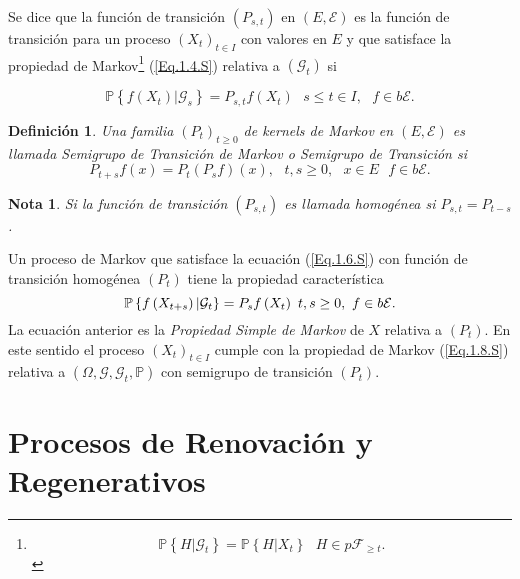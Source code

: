\documentclass{article}
\newtheorem{Def}{Definición}[section]
\newtheorem{Note}{Nota}%
\newcommand{\prob}{\mathbb{P}}
\newcommand{\ER}{\left(E,\mathcal{E}\right)}
\newcommand{\KM}{\left(P_{s,t}\right)}
\newcommand{\PE}{\left(X_{t}\right)_{t\in I}}
\numberwithin{equation}{section}
\begin{document}
Se dice que la funci\'on de transici\'on $\KM$ en $\ER$ es la funci\'on de transici\'on para un proceso $\PE$  con valores en $E$ y que satisface la propiedad de Markov\footnote{\begin{equation}\label{Eq.1.4.S}
\prob\left\{H|\mathcal{G}_{t}\right\}=\prob\left\{H|X_{t}\right\}\textrm{ }H\in p\mathcal{F}_{\geq t}.
\end{equation}} (\ref{Eq.1.4.S}) relativa a $\left(\mathcal{G}_{t}\right)$ si

\begin{equation}\label{Eq.1.6.S}
\prob\left\{f\left(X_{t}\right)|\mathcal{G}_{s}\right\}=P_{s,t}f\left(X_{t}\right)\textrm{ }s\leq t\in I,\textrm{ }f\in b\mathcal{E}.
\end{equation}

\begin{Def}
Una familia $\left(P_{t}\right)_{t\geq0}$ de kernels de Markov en $\ER$ es llamada {\em Semigrupo de Transici\'on de Markov} o {\em Semigrupo de Transici\'on} si
\[P_{t+s}f\left(x\right)=P_{t}\left(P_{s}f\right)\left(x\right),\textrm{ }t,s\geq0,\textrm{ }x\in E\textrm{ }f\in b\mathcal{E}.\]
\end{Def}
\begin{Note}
Si la funci\'on de transici\'on $\KM$ es llamada homog\'enea si $P_{s,t}=P_{t-s}$.
\end{Note}

Un proceso de Markov que satisface la ecuaci\'on (\ref{Eq.1.6.S}) con funci\'on de transici\'on homog\'enea $\left(P_{t}\right)$ tiene la propiedad caracter\'istica
\begin{equation}\label{Eq.1.8.S}\index{Propiedad Simple de Markov}
\prob\left\{f\left(X_{t+s}\right)|\mathcal{G}_{t}\right\}=P_{s}f\left(X_{t}\right)\textrm{ }t,s\geq0,\textrm{ }f\in b\mathcal{E}.
\end{equation}
La ecuaci\'on anterior es la {\em Propiedad Simple de Markov} de $X$ relativa a $\left(P_{t}\right)$. En este sentido el proceso $\PE$ cumple con la propiedad de Markov (\ref{Eq.1.8.S}) relativa a $\left(\Omega,\mathcal{G},\mathcal{G}_{t},\prob\right)$ con semigrupo de transici\'on $\left(P_{t}\right)$.

\section{Procesos de Renovaci\'on y Regenerativos}
\end{document}
